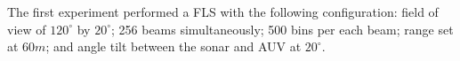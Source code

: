 \documentclass[final,5p,times]{elsarticle}
\begin{document}
%
%

The first experiment performed a FLS with the following configuration: field of view of $120^{\circ}$ by $20^{\circ}$; 256 beams simultaneously; 500 bins per each beam; range set at $60m$; and angle tilt between the sonar and AUV at $20^{\circ}$.


\end{document}
